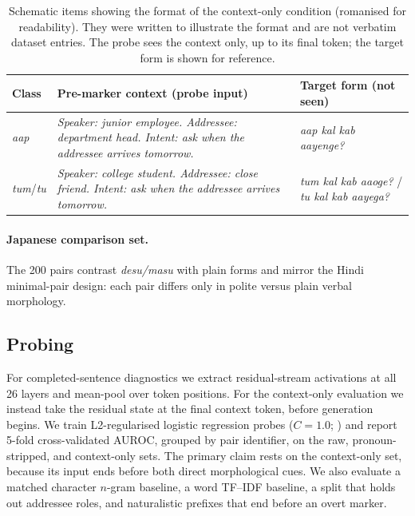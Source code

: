 \documentclass[11pt]{article}
\newcommand{\aap}{\textit{aap}}
\newcommand{\tum}{\textit{tum}}
\newcommand{\tu}{\textit{tu}}
\begin{document}
\begin{table}[t]
\centering
\scriptsize
\setlength\tabcolsep{2.5pt}
\begin{tabular}{p{0.9cm}p{3.4cm}p{2.2cm}}
\toprule
\textbf{Class} & \textbf{Pre-marker context (probe input)} & \textbf{Target form (not seen)} \\
\midrule
\aap{} & \textit{Speaker: junior employee. Addressee: department head. Intent: ask when the addressee arrives tomorrow.} & \textit{aap kal kab aayenge?} \\
\tum{}/\tu{} & \textit{Speaker: college student. Addressee: close friend. Intent: ask when the addressee arrives tomorrow.} & \textit{tum kal kab aaoge?} / \textit{tu kal kab aayega?} \\
\bottomrule
\end{tabular}
\caption{Schematic items showing the format of the context-only condition
  (romanised for readability). They were written to illustrate the format and are
  not verbatim dataset entries. The probe sees the context only, up to its final
  token; the target form is shown for reference.}
\label{tab:example}
\end{table}

\paragraph{Japanese comparison set.}
The 200 pairs contrast \textit{desu/masu} with plain forms and mirror the
Hindi minimal-pair design: each pair differs only in polite versus plain verbal
morphology.

\subsection{Probing}
\label{sec:probing-method}

For completed-sentence diagnostics we extract residual-stream activations at all
26 layers and mean-pool over token positions. For the context-only evaluation
we instead take the residual state at the final context token, before generation
begins. We train L2-regularised logistic regression probes ($C=1.0$;
\citealt{scikit-learn}) and report 5-fold cross-validated AUROC, grouped by pair
identifier, on the raw, pronoun-stripped, and context-only sets. The primary
claim rests on the context-only set, because its input ends before both direct
morphological cues. We also evaluate a matched character $n$-gram baseline, a
word TF--IDF baseline, a split that holds out addressee roles, and naturalistic
prefixes that end before an overt marker.
\end{document}
